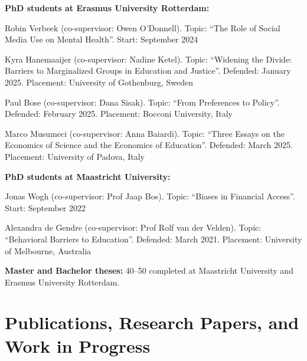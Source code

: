 \documentclass[11pt,a4paper]{article}
\begin{document}
\textbf{PhD students at Erasmus University Rotterdam:}
\begin{pubs}
  \item Robin Verbeek (co-supervisor: Owen O'Donnell). Topic: ``The Role of Social Media Use on Mental Health''. Start: September 2024
  \item Kyra Hanemaaijer (co-supervisor: Nadine Ketel). Topic: ``Widening the Divide: Barriers to Marginalized Groups in Education and Justice''. Defended: January 2025. Placement: University of Gothenburg, Sweden
  \item Paul Bose (co-supervisor: Dana Sisak). Topic: ``From Preferences to Policy''. Defended: February 2025. Placement: Bocconi University, Italy
  \item Marco Musumeci (co-supervisor: Anna Baiardi). Topic: ``Three Essays on the Economics of Science and the Economics of Education''. Defended: March 2025. Placement: University of Padova, Italy
\end{pubs}

\textbf{PhD students at Maastricht University:}
\begin{pubs}
  \item Jonas Wogh (co-supervisor: Prof Jaap Bos). Topic: ``Biases in Financial Access''. Start: September 2022
  \item Alexandra de Gendre (co-supervisor: Prof Rolf van der Velden). Topic: ``Behavioral Barriers to Education''. Defended: March 2021. Placement: University of Melbourne, Australia
\end{pubs}

\textbf{Master and Bachelor theses:} 40--50 completed at Maastricht University and Erasmus University Rotterdam.

\section{Publications, Research Papers, and Work in Progress}
\end{document}
